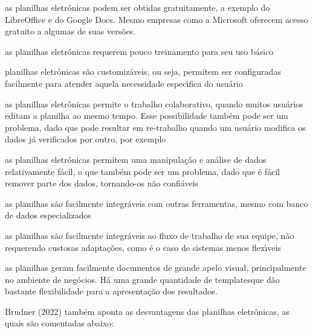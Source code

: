 \documentclass[
12pt,		%
openright,	%
twoside,  %
a4paper,			%
chapter=TITLE,		%
english,			%
french,				%
spanish,			%
brazil				%
]{USPSC-classe/USPSC_RedarTex}
\begin{document}
\begin{alineas}
\item as planilhas eletr\^onicas podem ser obtidas gratuitamente, a exemplo do LibreOffice e do Google Docs. Mesmo empresas como a Microsoft oferecem acesso gratuito a algumas de suas vers\~oes.
\item as planilhas eletr\^onicas requerem pouco treinamento para seu uso b\'asico
\item planilhas eletr\^onicas s\~ao \textquotedbl customiz\'aveis\textquotedbl , ou seja, permitem ser configuradas facilmente para atender aquela necessidade espec\'{\i}fica do usu\'ario
\item as planilhas eletr\^onicas permite o trabalho colaborativo, quando muitos usu\'arios editam a planilha ao mesmo tempo. Esse possibilidade tamb\'em pode ser um problema, dado que pode resultar em re-trabalho quando um usu\'ario modifica os dados j\'a verificados por outro, por exemplo
\item as planilhas eletr\^onicas permitem uma manipula\c{c}\~ao e an\'alise de dados relativamente f\'acil, o que tamb\'em pode ser um problema, dado que \'e f\'acil remover parte dos dados, tornando-os n\~ao confi\'aveis
\item as planilhas s\~ao facilmente integr\'aveis com outras  ferramentas, mesmo com banco de dados especializados
\item as planilhas s\~ao facilmente integr\'aveis ao fluxo de trabalho de sua equipe, n\~ao requerendo custosas adapta\c{c}\~oes, como \'e o caso de sistemas menos flex\'{\i}veis
\item as planilhas geram facilmente documentos de grande apelo visual, principalmente no ambiente de neg\'ocios. H\'a uma grande quantidade de \textquotedbl templates\textquotedbl  que d\~ao bastante flexibilidade para a apresenta\c{c}\~ao dos resultados.
\end{alineas}

 Brudner (2022) tamb\'em aponta as desvantagens das planilhas eletr\^onicas, as quais s\~ao comentadas abaixo:
\end{document}

